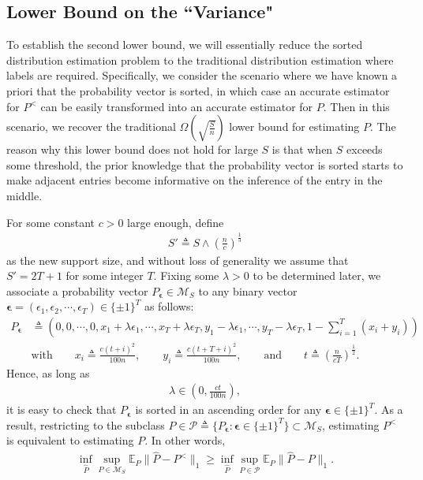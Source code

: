 \documentclass[final,12pt]{colt2018} %
\def \bE {\mathbb{E}}
\newcommand{\calM}{{\mathcal{M}}}
\newcommand{\calP}{{\mathcal{P}}}
\begin{document}
\subsection{Lower Bound on the ``Variance"}
To establish the second lower bound, we will essentially reduce the sorted distribution estimation problem to the traditional distribution estimation where labels are required. Specifically, we consider the scenario where we have known a priori that the probability vector is sorted, in which case an accurate estimator for $P^<$ can be easily transformed into an accurate estimator for $P$. Then in this scenario, we recover the traditional $\Omega(\sqrt{\frac{S}{n}})$ lower bound for estimating $P$. The reason why this lower bound does not hold for large $S$ is that when $S$ exceeds some threshold, the prior knowledge that the probability vector is sorted starts to make adjacent entries become informative on the inference of the entry in the middle.

For some constant $c>0$ large enough, define
\begin{align*}
S' \triangleq S \wedge \left(\frac{n}{c}\right)^{\frac{1}{3}}
\end{align*}
as the new support size, and without loss of generality we assume that $S'=2T+1$ for some integer $T$. Fixing some $\lambda>0$ to be determined later, we associate a probability vector $P_{\bm{\epsilon}}\in\calM_S$ to any binary vector $\bm{\epsilon}=(\epsilon_1,\epsilon_2,\cdots,\epsilon_T)\in\{\pm 1\}^T$ as follows:
\begin{align*}
P_{\bm{\epsilon}} &\triangleq ( 0, 0, \cdots, 0, x_1+\lambda\epsilon_1,\cdots,x_T+\lambda\epsilon_T,y_1-\lambda\epsilon_1,\cdots,y_T-\lambda\epsilon_T, 1-\sum_{i=1}^T (x_i+y_i))\\
&\text{with} \qquad x_i\triangleq \frac{c(t+i)^2}{100n}, \qquad y_i\triangleq \frac{c(t+T+i)^2}{100n}, \qquad \text{and} \qquad t\triangleq\left(\frac{n}{cT}\right)^{\frac{1}{2}}.
\end{align*}
Hence, as long as
\begin{align}\label{eq:condition_lambda}
\lambda \in \left(0, \frac{ct}{100n}\right),
\end{align}
it is easy to check that $P_{\bm{\epsilon}}$ is sorted in an ascending order for any $\bm{\epsilon}\in \{\pm 1\}^T$. As a result, restricting to the subclass $P\in \calP\triangleq\{P_{\bm{\epsilon}}: \bm{\epsilon}\in \{\pm 1\}^T\}\subset \calM_S$, estimating $P^<$ is equivalent to estimating $P$. In other words,
\begin{align}\label{eq.reduction}
\inf_{\hat{P}}\sup_{P\in \calM_S} \bE_P\|\hat{P}-P^<\|_1 \ge \inf_{\hat{P}}\sup_{P\in \calP} \bE_P\|\hat{P}-P\|_1.
\end{align}
\end{document}
